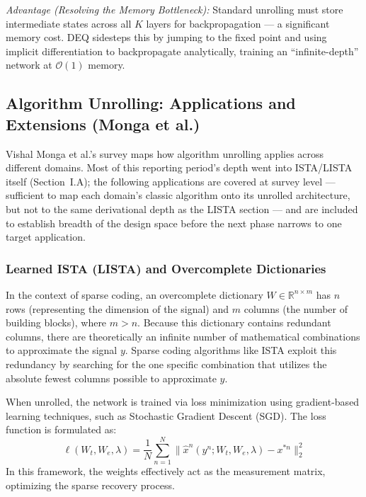 \documentclass[conference]{IEEEtran}
\begin{document}
\textit{Advantage (Resolving the Memory Bottleneck):} Standard unrolling must store intermediate states across all $K$ layers for backpropagation — a significant memory cost. DEQ sidesteps this by jumping to the fixed point and using implicit differentiation to backpropagate analytically, training an ``infinite-depth'' network at $\mathcal{O}(1)$ memory.

\subsection{Algorithm Unrolling: Applications and Extensions (Monga et al.) \texorpdfstring{\cite{monga2021algorithm}}{}}

Vishal Monga et al.'s survey maps how algorithm unrolling applies across different domains. Most of this reporting period's depth went into ISTA/LISTA itself (Section~I.A); the following applications are covered at survey level — sufficient to map each domain's classic algorithm onto its unrolled architecture, but not to the same derivational depth as the LISTA section — and are included to establish breadth of the design space before the next phase narrows to one target application.
\subsubsection{Learned ISTA (LISTA) and Overcomplete Dictionaries}
In the context of sparse coding, an overcomplete dictionary $W \in \mathbb{R}^{n \times m}$ has $n$ rows (representing the dimension of the signal) and $m$ columns (the number of building blocks), where $m > n$. Because this dictionary contains redundant columns, there are theoretically an infinite number of mathematical combinations to approximate the signal $y$. Sparse coding algorithms like ISTA exploit this redundancy by searching for the one specific combination that utilizes the absolute fewest columns possible to approximate $y$. 

When unrolled, the network is trained via loss minimization using gradient-based learning techniques, such as Stochastic Gradient Descent (SGD). The loss function is formulated as:
\begin{equation}
\ell(W_t, W_e, \lambda) = \frac{1}{N} \sum_{n=1}^{N} \| \hat{x}^n(y^n; W_t, W_e, \lambda) - x^{*n} \|_2^2
\end{equation}
In this framework, the weights effectively act as the measurement matrix, optimizing the sparse recovery process.
\end{document}
